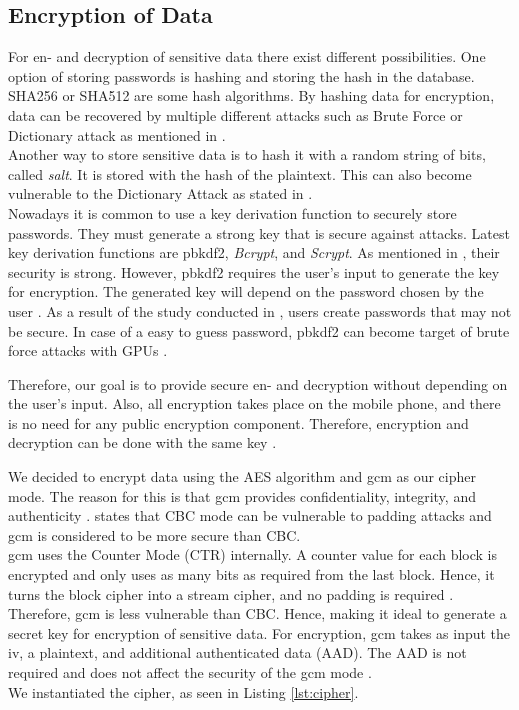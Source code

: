 \subsection{Encryption of Data}\label{arch_encryption}
For en- and decryption of sensitive data there exist different possibilities. One option of storing passwords is hashing and storing the hash in the database. SHA256 or SHA512 are some hash algorithms. By hashing data for encryption, data can be recovered by multiple different attacks such as Brute Force or Dictionary attack as mentioned in \cite{ertaul2016implementation}. \\
Another way to store sensitive data is to hash it with a random string of bits, called \textit{salt}. It is stored with the hash of the plaintext. This can also become vulnerable to the Dictionary Attack as stated in \cite{3wrongways}. \\
Nowadays it is common to use a key derivation function to securely store passwords. They must generate a strong key that is secure against attacks. Latest key derivation functions are \gls{pbkdf2}, \textit{Bcrypt}, and \textit{Scrypt}. As mentioned in \cite{ertaul2016implementation}, their security is strong.
However, \gls{pbkdf2} requires the user's input to generate the key for encryption. The generated key will depend on the password chosen by the user \cite{Agilebits}. As a result of the study conducted in \cite{DBLP:journals/ieeesp/YanBAG04}, users create passwords that may not be secure. In case of a easy to guess password, \gls{pbkdf2} can become target of brute force attacks with GPUs \cite{DBLP:conf/esorics/DurmuthGKPYZ12}.

Therefore, our goal is to provide secure en- and decryption without depending on the user's input. Also, all encryption takes place on the mobile phone, and there is no need for any public encryption component. Therefore, encryption and decryption can be done with the same key \cite{DBLP:journals/ijnsec/ElminaamKH10}.

We decided to encrypt data using the AES algorithm and \gls{gcm} as our cipher mode. The reason for this is that \gls{gcm} provides confidentiality, integrity, and authenticity \cite{AESJavaAndroid}. \cite{GCMSecure} states that CBC mode can be vulnerable to padding attacks and \gls{gcm} is considered to be more secure than CBC. \\
\gls{gcm} uses the Counter Mode (CTR) internally. A counter value for each block is encrypted and only uses as many bits as required from the last block. Hence, it turns the block cipher into a stream cipher, and no padding is required \cite{IVtransmission}. Therefore, \gls{gcm} is less vulnerable than CBC. Hence, making it ideal to generate a secret key for encryption of sensitive data. For encryption, \gls{gcm} takes as input the \gls{iv}, a plaintext, and additional authenticated data (AAD). The AAD is not required and does not affect the security of the \gls{gcm} mode \cite{AADsecure}. \\
We instantiated the cipher, as seen in Listing \ref{lst:cipher}.

